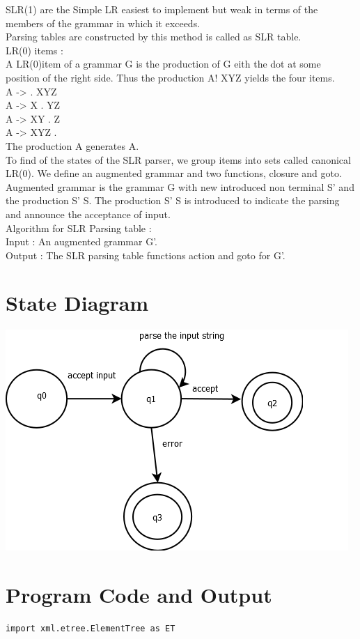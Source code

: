 \documentclass[12pt]{article}
\begin{document}
{SLR(1) are the Simple LR easiest to implement but weak in terms of the members of the
grammar in which it exceeds.\\
Parsing tables are constructed by this method is called as SLR table.\\
LR(0) items :\\
A LR(0)item of a grammar G is the production of G eith the dot at some position of
the right side. Thus the production A! XYZ yields the four items.\\
A -> . XYZ\\
A -> X . YZ\\
A -> XY . Z\\
A -> XYZ .\\
The production A generates A.\\
To find of the states of the SLR parser, we group items into sets called canonical LR(0).
We define an augmented grammar and two functions, closure and goto.\\
Augmented grammar is the grammar G with new introduced non terminal S’ and the
production S’ S. The production S’ S is introduced to indicate the parsing and
announce the acceptance of input.\\
Algorithm for SLR Parsing table :\\
Input : An augmented grammar G’.\\
Output : The SLR parsing table functions action and goto for G’.\\

\section{State Diagram }
\includegraphics{b8state}

\section{Program Code and Output}
\begin{verbatim}
import xml.etree.ElementTree as ET


\end{verbatim}}
\end{document}
